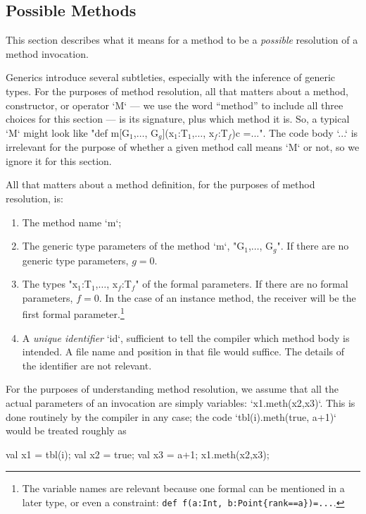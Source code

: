 \subsection{Possible Methods}

This section describes what it means for a method to be a {\em possible}
resolution of a method invocation.  



Generics introduce several subtleties, especially with the inference of
generic types. 
For the purposes of method resolution, all that matters about a method,
constructor, or operator \xcd`M` --- we use the word ``method'' to include all
three choices for this section --- is its signature, plus which method it is.
So, a typical \xcd`M` might look like 
\xcdmath"def m[G$_1$,$\ldots$, G$_g$](x$_1$:T$_1$,$\ldots$, x$_f$:T$_f$){c} =...".  The code body \xcd`...` is irrelevant for the purpose of whether a
given method call means \xcd`M` or not, so we ignore it for this section.

All that matters about a method definition, for the purposes of method
resolution, is: 
\begin{enumerate}
\item The method name \xcd`m`;
\item The generic type parameters of the method \xcd`m`,  \xcdmath"G$_1$,$\ldots$, G$_g$".  If there
      are no generic type parameters, {$g=0$}.  
\item The types \xcdmath"x$_1$:T$_1$,$\ldots$, x$_f$:T$_f$" of the formal parameters.  If
      there are no formal parameters, {$f=0$}. In the case of an instance
      method, the receiver will be the first formal parameter.\footnote{The
      variable names are relevant because one formal can be mentioned in a
      later type, or even a constraint: {\tt def f(a:Int, b:Point\{rank==a\})=...}.}
\item A {\em unique identifier} \xcd`id`, sufficient to tell the compiler
      which method body is intended.  A file name and position in that file
      would suffice.  The details of the identifier are not relevant.
\end{enumerate}

For the purposes of understanding method resolution, we assume that all the
actual parameters of an invocation are simply variables: \xcd`x1.meth(x2,x3)`.
This is done routinely by the compiler in any case; the code 
\xcd`tbl(i).meth(true, a+1)` would be treated roughly as 
\begin{xten}
val x1 = tbl(i);
val x2 = true;
val x3 = a+1;
x1.meth(x2,x3);
\end{xten}


